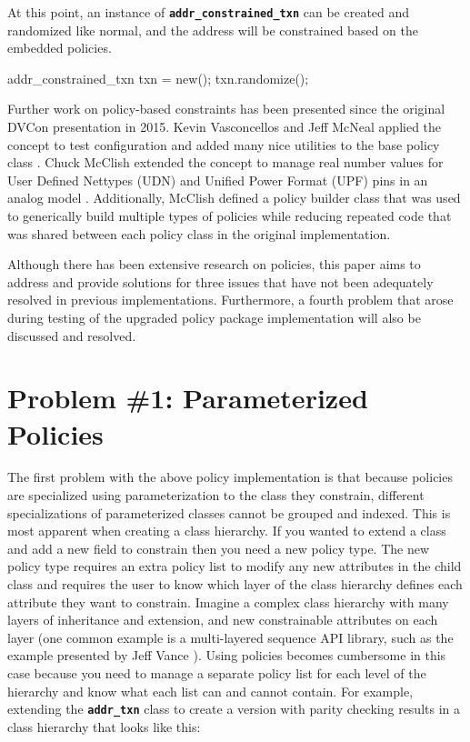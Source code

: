 \documentclass[conference,onecolumn]{IEEEtran}
\newcommand{\code}[1]{
\textbf{\texttt{#1}}
}
\begin{document}
At this point, an instance of \code{addr_constrained_txn} can be created and randomized like normal, and the address will be constrained based on the embedded policies.

{\begin{svcode}
addr_constrained_txn txn = new();
txn.randomize();
\end{svcode}
\captionof{figure}{Randomizing an instance of \code{addr_constrained_txn}}}

Further work on policy-based constraints has been presented since the original DVCon presentation in 2015. Kevin Vasconcellos and Jeff McNeal applied the concept to test configuration and added many nice utilities to the base policy class \cite{b3}. Chuck McClish extended the concept to manage real number values for User Defined Nettypes (UDN) and Unified Power Format (UPF) pins in an analog model \cite{b4}. Additionally, McClish defined a policy builder class that was used to generically build multiple types of policies while reducing repeated code that was shared between each policy class in the original implementation.

Although there has been extensive research on policies, this paper aims to address and provide solutions for three issues that have not been adequately resolved in previous implementations. Furthermore, a fourth problem that arose during testing of the upgraded policy package implementation will also be discussed and resolved.

\section{Problem \#1: Parameterized Policies}

The first problem with the above policy implementation is that because policies are specialized using parameterization to the class they constrain, different specializations of parameterized classes cannot be grouped and indexed. This is most apparent when creating a class hierarchy. If you wanted to extend a class and add a new field to constrain then you need a new policy type. The new policy type requires an extra policy list to modify any new attributes in the child class and requires the user to know which layer of the class hierarchy defines each attribute they want to constrain. Imagine a complex class hierarchy with many layers of inheritance and extension, and new constrainable attributes on each layer (one common example is a multi-layered sequence API library, such as the example presented by Jeff Vance \cite{b5}). Using policies becomes cumbersome in this case because you need to manage a separate policy list for each level of the hierarchy and know what each list can and cannot contain. For example, extending the \code{addr_txn} class to create a version with parity checking results in a class hierarchy that looks like this:
\end{document}
